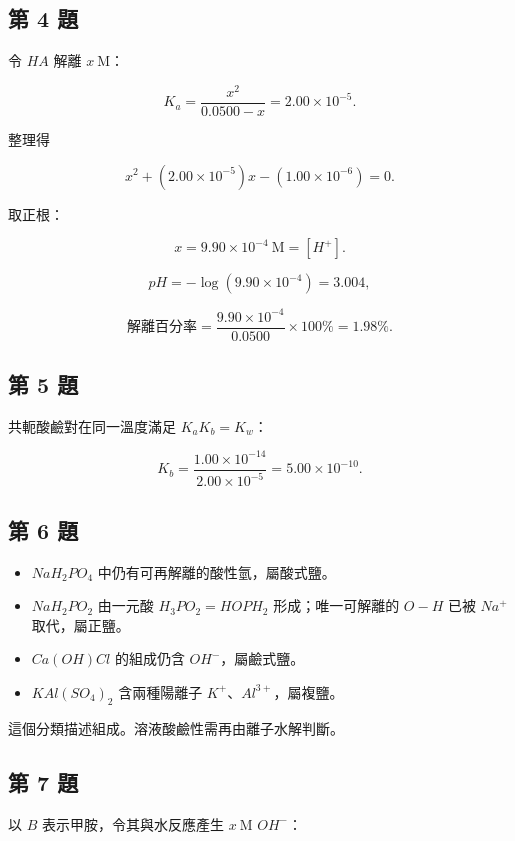 \documentclass[11pt,a4paper]{article}
\providecommand{\tightlist}{%
  \setlength{\itemsep}{0pt}\setlength{\parskip}{0pt}}
\begin{document}
\subsection{第 4 題}\label{ux7b2c-4-ux984c}

令 \(HA\) 解離 \(x\ \mathrm M\)：

\[
K_a=\frac{x^2}{0.0500-x}=2.00\times10^{-5}.
\]

整理得

\[
x^2+(2.00\times10^{-5})x-(1.00\times10^{-6})=0.
\]

取正根：

\[
x=9.90\times10^{-4}\ \mathrm M=[H^+].
\]

\[
pH=-\log(9.90\times10^{-4})=3.004,
\]

\[
\text{解離百分率}=\frac{9.90\times10^{-4}}{0.0500}\times100\%
=1.98\%.
\]

\subsection{第 5 題}\label{ux7b2c-5-ux984c}

共軛酸鹼對在同一溫度滿足 \(K_aK_b=K_w\)：

\[
K_b=\frac{1.00\times10^{-14}}{2.00\times10^{-5}}
=5.00\times10^{-10}.
\]

\subsection{第 6 題}\label{ux7b2c-6-ux984c}

\begin{itemize}
\tightlist
\item
  \(NaH_2PO_4\) 中仍有可再解離的酸性氫，屬酸式鹽。
\item
  \(NaH_2PO_2\) 由一元酸 \(H_3PO_2=HOPH_2\) 形成；唯一可解離的 \(O-H\) 已被 \(Na^+\) 取代，屬正鹽。
\item
  \(Ca(OH)Cl\) 的組成仍含 \(OH^-\)，屬鹼式鹽。
\item
  \(KAl(SO_4)_2\) 含兩種陽離子 \(K^+\)、\(Al^{3+}\)，屬複鹽。
\end{itemize}

這個分類描述組成。溶液酸鹼性需再由離子水解判斷。

\subsection{第 7 題}\label{ux7b2c-7-ux984c}

以 \(B\) 表示甲胺，令其與水反應產生 \(x\ \mathrm M\) \(OH^-\)：
\end{document}

